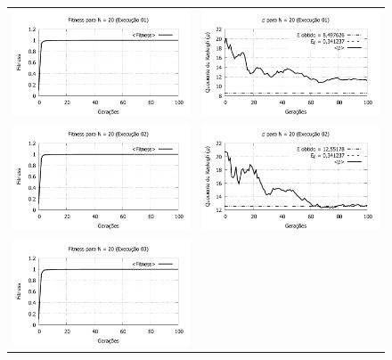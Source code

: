 \begin{figure}[htbp]
\centering
  \begin{tabular}{@{}cc@{}}
    \includegraphics[width=.45\textwidth]{figs/resultados/fitnessGrad/N20_01_fitness.pdf} &
    \includegraphics[width=.45\textwidth]{figs/resultados/fitnessGrad/N20_01_rho.pdf}   \\
		\includegraphics[width=.45\textwidth]{figs/resultados/fitnessGrad/N20_02_fitness.pdf} &
    \includegraphics[width=.45\textwidth]{figs/resultados/fitnessGrad/N20_02_rho.pdf}   \\
		\includegraphics[width=.45\textwidth]{figs/resultados/fitnessGrad/N20_03_fitness.pdf} &

\end{tabular}
\end{figure}
